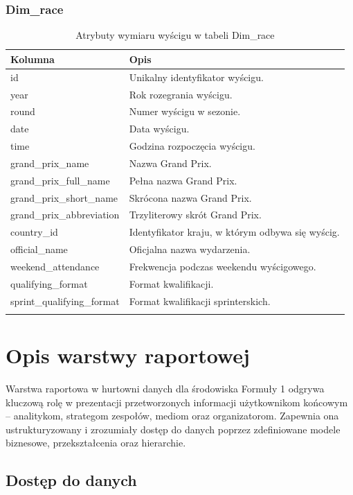 \documentclass[12pt]{article}
\begin{document}
\subsubsection{Dim\_race}
\begin{longtable}{lp{8.5cm}}
\toprule
\textbf{Kolumna} & \textbf{Opis} \\
\midrule
\endhead

id & Unikalny identyfikator wyścigu. \\
year & Rok rozegrania wyścigu. \\
round & Numer wyścigu w sezonie. \\
date & Data wyścigu. \\
time & Godzina rozpoczęcia wyścigu. \\
grand\_prix\_name & Nazwa Grand Prix. \\
grand\_prix\_full\_name & Pełna nazwa Grand Prix. \\
grand\_prix\_short\_name & Skrócona nazwa Grand Prix. \\
grand\_prix\_abbreviation & Trzyliterowy skrót Grand Prix. \\
country\_id & Identyfikator kraju, w którym odbywa się wyścig. \\
official\_name & Oficjalna nazwa wydarzenia. \\
weekend\_attendance & Frekwencja podczas weekendu wyścigowego. \\
qualifying\_format & Format kwalifikacji. \\
sprint\_qualifying\_format & Format kwalifikacji sprinterskich. \\


\bottomrule
\caption{Atrybuty wymiaru wyścigu w tabeli Dim\_race}
\end{longtable}


\section{Opis warstwy raportowej}

Warstwa raportowa w hurtowni danych dla środowiska Formuły 1 odgrywa kluczową rolę w prezentacji przetworzonych informacji użytkownikom końcowym – analitykom, strategom zespołów, mediom oraz organizatorom. Zapewnia ona ustrukturyzowany i zrozumiały dostęp do danych poprzez zdefiniowane modele biznesowe, przekształcenia oraz hierarchie.

\subsection*{Dostęp do danych}
\end{document}

